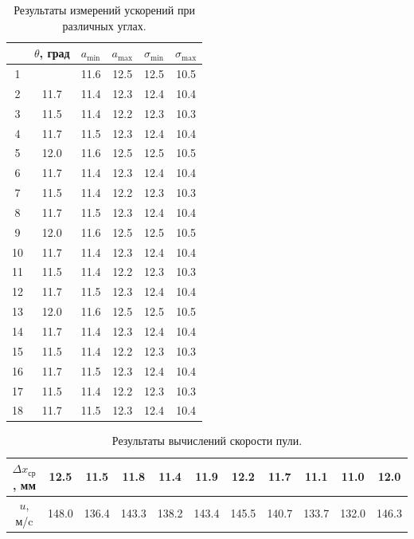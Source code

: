 \documentclass[
	a4paper, %
	12pt, %
]{article}
\begin{document}
	\begin{table}[h]
		\centering
		\begin{tabular}[H]{|c|c|c|c|c|c|}
			\hline
			\textnumero & $\theta$, град & $a_{\min}$ & $a_{\max}$ & $\sigma_{\min}$ & $\sigma_{\max}$  \\
			\hline
			1 &  & 11.6 & 12.5 & 12.5 & 10.5  \\
			\hline
			2 & 11.7 & 11.4 & 12.3 & 12.4 & 10.4   \\
			\hline
			3 & 11.5 & 11.4 & 12.2 & 12.3 & 10.3   \\
			\hline
			4 & 11.7 & 11.5 & 12.3 & 12.4 & 10.4  \\
			\hline
			5 & 12.0 & 11.6 & 12.5 & 12.5 & 10.5  \\
			\hline
			6 & 11.7 & 11.4 & 12.3 & 12.4 & 10.4   \\
			\hline
			7 & 11.5 & 11.4 & 12.2 & 12.3 & 10.3   \\
			\hline
			8 & 11.7 & 11.5 & 12.3 & 12.4 & 10.4  \\
			\hline
			9 & 12.0 & 11.6 & 12.5 & 12.5 & 10.5  \\
			\hline
			10 & 11.7 & 11.4 & 12.3 & 12.4 & 10.4   \\
			\hline
			11 & 11.5 & 11.4 & 12.2 & 12.3 & 10.3   \\
			\hline
			12 & 11.7 & 11.5 & 12.3 & 12.4 & 10.4  \\
			\hline
			13 & 12.0 & 11.6 & 12.5 & 12.5 & 10.5  \\
			\hline
			14 & 11.7 & 11.4 & 12.3 & 12.4 & 10.4   \\
			\hline
			15 & 11.5 & 11.4 & 12.2 & 12.3 & 10.3   \\
			\hline
			16 & 11.7 & 11.5 & 12.3 & 12.4 & 10.4  \\
			\hline
			17 & 11.5 & 11.4 & 12.2 & 12.3 & 10.3   \\
			\hline
			18 & 11.7 & 11.5 & 12.3 & 12.4 & 10.4  \\
			\hline
		\end{tabular}
		\caption{Результаты измерений ускорений при различных углах.}
		\label{table:2}
	\end{table}
	\begin{table}[h]
		\centering
		\begin{tabular}[H]{|c|c|c|c|c|c|c|c|c|c|c|}
			\hline
			$\Delta x_{\text{ср}}$, мм & 12.5 & 11.5 & 11.8 & 11.4 & 11.9 & 12.2 & 11.7 & 11.1 & 11.0 & 12.0  \\
			\hline
			$u$, м/c & 148.0 & 136.4 & 143.3 & 138.2 & 143.4  & 145.5 & 140.7 & 133.7 & 132.0 & 146.3  \\
			\hline
		\end{tabular}
		\caption{Результаты вычислений скорости пули.}
		\label{table:3}
	\end{table}
	
\end{document}
